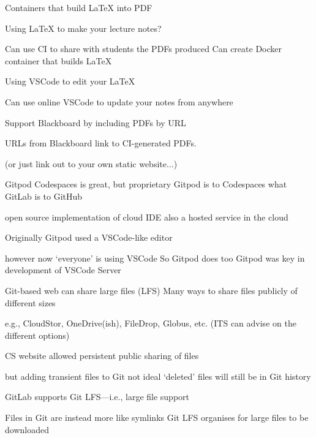 \documentclass[aspectratio=169,t]{beamer}
\begin{document}
\begin{dframe}{Containers that build \LaTeX{} into PDF}

  \1 Using \LaTeX{} to make your lecture notes?
  
  \2 Can use CI to share with students the PDFs produced
  \2 Can create Docker container that builds \LaTeX{}
  
  \1 Using VSCode to edit your \LaTeX{}

  \2 Can use online VSCode to update your notes from anywhere


  \1 Support Blackboard by including PDFs by URL
 
  \2 URLs from Blackboard link to CI-generated PDFs.

  \2 (or just link out to your own static website...)

\end{dframe}


\begin{dframe}{Gitpod}
  \1 Codespaces is great, but proprietary
  \1 Gitpod is to Codespaces what GitLab is to GitHub
  
  \2 open source implementation of cloud IDE
  \2 also a hosted service in the cloud

  \1 Originally Gitpod used a VSCode-like editor

  \2 however now `everyone' is using VSCode
  \2 So Gitpod does too
  \2 Gitpod was key in development of VSCode Server
\end{dframe}

\begin{dframe}{Git-based web can share large files (LFS)}
  \1 Many ways to share files publicly of different sizes

  \2 e.g., CloudStor, OneDrive(ish), FileDrop, Globus, etc.
  \2 (ITS can advise on the different options)

  \1 CS website allowed persistent public sharing of files

  \2 but adding transient files to Git not ideal
  \2 `deleted' files will still be in Git history

  \1 GitLab supports Git LFS---i.e., large file support

  \2 Files in Git are instead more like symlinks
  \2 Git LFS organises for large files to be downloaded


\end{dframe}

\begin{comment}
\begin{dframe}{FaaS, serverless and responsiveness}
  \1 Edge appearance
\end{dframe}
\end{comment}
\end{document}
